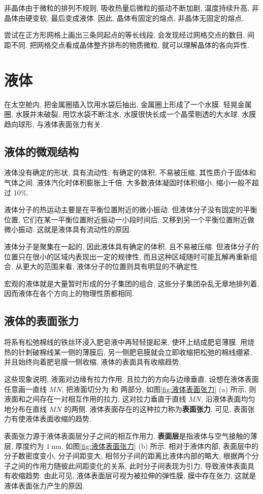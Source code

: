 \documentclass[UTF8,openany,fontset=fandol]{ctexbook}
\theoremstyle{chinesetextbook}
\newcommand{\unit}[1]{\ \mathrm{#1}}
\begin{document}
非晶体由于微粒的排列不规则, 吸收热量后微粒的振动不断加剧, 温度持续升高, 非晶体由硬变软, 最后变成液体. 因此, 晶体有固定的熔点, 非晶体无固定的熔点.

尝试在正方形网格上画出三条同起点的等长线段, 会发现经过网格交点的数目, 间距不同. 把网格交点看成晶体整齐排布的物质微粒, 就可以理解晶体的各向异性.
\section{液体}
在太空舱内, 把金属圈插入饮用水袋后抽出, 金属圈上形成了一个水膜. 轻晃金属圈, 水膜并未破裂, 用饮水袋不断注水, 水膜很快长成一个晶莹剔透的大水球. 水膜趋向球形, 与液体表面张力有关.
\subsection{液体的微观结构}
液体没有确定的形状, 具有流动性; 有确定的体积, 不易被压缩, 其性质介于固体和气体之间. 液体汽化时体积膨胀上千倍, 大多数液体凝固时体积缩小, 缩小一般不超过 10\%.

液体分子的热运动主要是在平衡位置附近的微小振动. 但液体分子没有固定的平衡位置, 它们在某一平衡位置附近振动一小段时间后, 又移到另一个平衡位置附近做微小振动. 这就是液体具有流动性的原因.

液体分子是聚集在一起的, 因此液体具有确定的体积, 且不易被压缩. 但液体分子的位置只在很小的区域内表现出一定的规律性, 而且这种区域随时可能瓦解再重新组合. 从更大的范围来看, 液体分子的位置则具有明显的不确定性.

宏观的液体就是大量暂时形成的分子集团的组合, 这些分子集团杂乱无章地排列着, 因而液体在各个方向上的物理性质都相同.
\subsection{液体的表面张力}
{\kaishu 将系有松弛棉线的铁丝环浸入肥皂液中再轻轻提起来, 使环上结成肥皂薄膜. 用烧热的针刺破棉线某一侧的薄膜后, 另一侧肥皂膜就会立即收缩把松弛的棉线绷紧, 并且始终向着肥皂膜一侧收缩, 液体的表面具有收缩趋势.}

这些现象说明, 液面对边缘有拉力作用, 且拉力的方向与边缘垂直. 设想在液体表面任意画一直线 $MN$, 把液面切分为  和  两部分, 如图\ref{fig:液体表面张力} (a) 所示, 则液面和之间存在一对相互作用的拉力, 这对拉力垂直于直线 $MN$, 沿液体表面均匀地分布在直线 $MN$ 的两侧. 液体表面存在的这种拉力称为\textbf{表面张力}. 可见, 表面张力有使液体表面收缩的趋势.

表面张力源于液体表面层分子之间的相互作用力. \textbf{表面层}是指液体与空气接触的薄层, 厚度约为 $1\unit{nm}$, 如图\ref{fig:液体表面张力} (b) 所示. 相对于液体内部, 表面层中的分子数密度变小, 分子间距变大, 相邻分子间的距离比液体内部的略大, 根据两个分子之间的作用力随彼此间距变化的关系, 此时分子间表现为引力, 导致液体表面具有收缩趋势. 由此可见, 液体表面层可视为被拉伸的弹性膜, 膜中存在张力, 这就是液体表面张力产生的原因.
\end{document}
